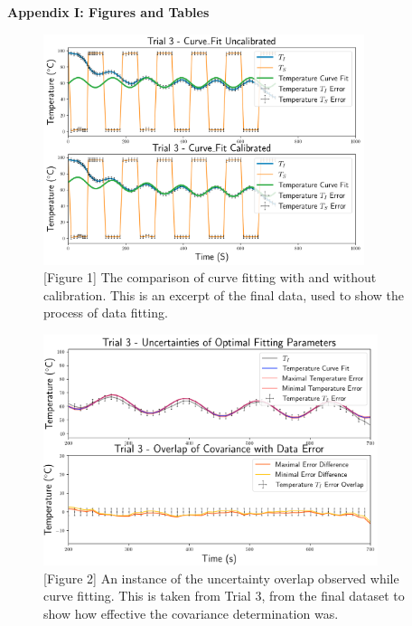 \documentclass[11pt]{article}
\begin{document}
    \pagebreak 



     \selectfont \textbf{Appendix I: Figures and Tables}
    
     \selectfont

\begin{multicols}{2}
    \begin{figure}[H]
        \hspace{-25pt} 
        \includegraphics[width=3.7in]{calibration comparison.png}
        \caption*{[Figure 1] The comparison of curve fitting with and without calibration. This is an excerpt of the final data, used to show the process of data fitting.}
    \end{figure}

\vspace{-20pt}

    \begin{figure}[H]
        \hspace{-5pt}
        \includegraphics[width=3.85in]{uncertainty example.png}
        \caption*{[Figure 2] An instance of the uncertainty overlap observed while curve fitting. This is taken from Trial 3, from the final dataset to show how effective the covariance determination was.}
    \end{figure}

\end{multicols}
\end{document}
